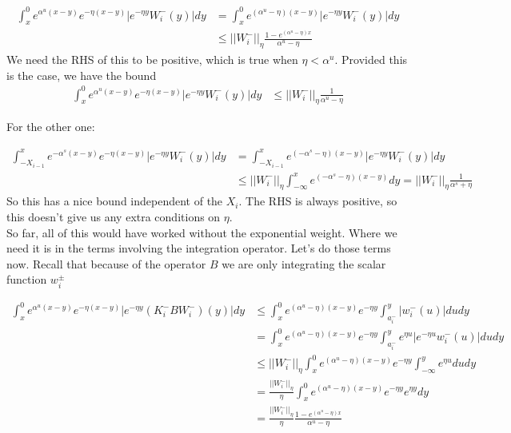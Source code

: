 \documentclass[12pt]{article}
\begin{document}
\begin{align*}
\int_x^0 e^{\alpha^u (x-y)}e^{-\eta(x-y)}|e^{-\eta y} W_i^-(y)| dy &= \int_x^0 e^{(\alpha^u - \eta) (x-y)}|e^{-\eta y} W_i^-(y)| dy \\
&\leq ||W_i^-||_\eta \frac{1 - e^{(\alpha^u - \eta)x}}{\alpha^u - \eta}
\end{align*}
We need the RHS of this to be positive, which is true when $\eta < \alpha^u$. Provided this is the case, we have the bound
\begin{align*}
\int_x^0 e^{\alpha^u (x-y)}e^{-\eta(x-y)}|e^{-\eta y} W_i^-(y)| dy &\leq ||W_i^-||_\eta \frac{1}{\alpha^u - \eta}
\end{align*}

For the other one:

\begin{align*}
\int_{-X_{i-1}}^x e^{-\alpha^s (x-y)}e^{-\eta(x-y)}|e^{-\eta y} W_i^-(y)| dy &= \int_{-X_{i-1}}^x e^{(-\alpha^s - \eta) (x-y)}|e^{-\eta y} W_i^-(y)| dy \\
&\leq ||W_i^-||_\eta \int_{-\infty}^x e^{(-\alpha^s - \eta) (x-y)} dy = ||W_i^-||_\eta \frac{1}{\alpha^s + \eta}
\end{align*}
So this has a nice bound independent of the $X_i$. The RHS is always positive, so this doesn't give us any extra conditions on $\eta$. \\

So far, all of this would have worked without the exponential weight. Where we need it is in the terms involving the integration operator. Let's do those terms now. Recall that because of the operator $B$ we are only integrating the scalar function $w_i^\pm$

\begin{align*}
\int_x^0 e^{\alpha^u (x-y)}e^{-\eta(x-y)}|e^{-\eta y} (K_i^- B W_i^-)(y)| dy &\leq \int_x^0 e^{(\alpha^u - \eta)(x-y)}e^{-\eta y} \int_{a_i^-}^y |w_i^-(u)| du dy \\
&= \int_x^0 e^{(\alpha^u - \eta)(x-y)}e^{-\eta y} \int_{a_i^-}^y e^{\eta u} |e^{-\eta u} w_i^-(u)| du dy \\
&\leq ||W_i^-||_\eta \int_x^0 e^{(\alpha^u - \eta)(x-y)}e^{-\eta y} \int_{-\infty}^y e^{\eta u} du dy \\
&= \frac{||W_i^-||_\eta}{\eta} \int_x^0 e^{(\alpha^u - \eta)(x-y)}e^{-\eta y} e^{\eta y} dy \\
&= \frac{||W_i^-||_\eta}{\eta} \frac{1 - e^{(\alpha^u - \eta)x}}{\alpha^u - \eta} 
\end{align*}
\end{document}
